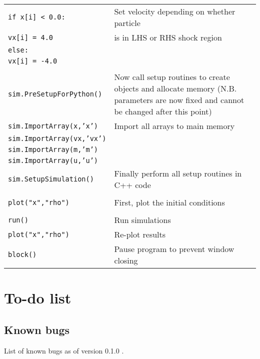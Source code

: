 \documentclass[a4paper]{article}
\newcommand{\VERNO}{0.1.0 }
\newcommand{\var}[1]{\texttt{#1}}
\begin{document}
\begin{tabular}{p{8.0cm}p{7.0cm}}
\hspace{0.5cm}\var{if x[i] < 0.0:}   & Set velocity depending on whether particle \\
\hspace{1cm}\var{vx[i] = 4.0}   & is in LHS or RHS shock region \\
\hspace{0.5cm}\var{else:} & \\
\hspace{1cm}\var{vx[i] = -4.0} & \\
& \\  
\var{sim.PreSetupForPython()}  & Now call setup routines to create objects and allocate memory 
(N.B. parameters are now fixed and cannot be changed after this point) \\
\var{sim.ImportArray(x,'x')}    & Import all arrays to main memory \\
\var{sim.ImportArray(vx,'vx')}  & \\
\var{sim.ImportArray(m,'m')}    & \\
\var{sim.ImportArray(u,'u')}    & \\
\var{sim.SetupSimulation()}     & Finally perform all setup routines in C++ code\\
& \\                                  
\var{plot("x","rho")}           & First, plot the initial conditions \\ 
& \\              
\var{run()}                     & Run simulations \\
\var{plot("x","rho")}           & Re-plot results \\
\var{block()}                   & Pause program to prevent window closing \\
\end{tabular}
\newline


\newpage


\section{To-do list}

\subsection{Known bugs}
List of known bugs as of version \VERNO.
\end{document}
